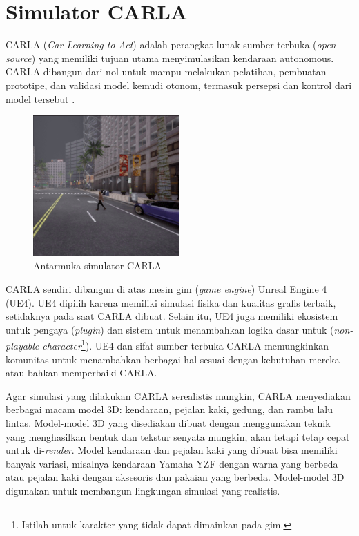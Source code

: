 \section{Simulator CARLA}

CARLA (\textit{Car Learning to Act}) adalah perangkat lunak sumber terbuka
(\textit{o\-pen sour\-ce}) yang memiliki tujuan utama menyimulasikan kendaraan
autonomous. CAR\-LA dibangun dari nol untuk mampu melakukan pelatihan, pembuatan
prototipe, dan validasi model kemudi otonom, termasuk persepsi dan kontrol dari
model tersebut \parencite{dos_carla}.

\begin{figure}[h!]
    \centering
    \includegraphics[width=0.5\textwidth]{resources/chapter-2/CARLA-cropped.png}
    \caption{Antarmuka simulator CARLA}
\end{figure}

CARLA sendiri dibangun di atas mesin gim (\textit{game engine}) Unreal Engine 4
(UE4). UE4 dipilih karena memiliki simulasi fisika dan kualitas grafis terbaik,
setidaknya pada saat CARLA dibuat. Selain itu, UE4 juga memiliki ekosistem untuk
pengaya (\textit{plugin}) dan sistem untuk menambahkan logika dasar untuk
(\textit{non-playable character}\footnote{Istilah untuk karakter yang tidak
    dapat dimainkan pada gim.}). UE4 dan sifat sumber terbuka CARLA memungkinkan
komunitas untuk menambahkan berbagai hal sesuai dengan kebutuhan mereka atau
bahkan memperbaiki CARLA.

Agar simulasi yang dilakukan CARLA serealistis mungkin, CARLA menyediakan
berbagai macam model 3D: kendaraan, pejalan kaki, gedung, dan rambu lalu lintas.
Model-model 3D yang disediakan dibuat dengan menggunakan teknik yang
menghasilkan bentuk dan tekstur senyata mungkin, akan tetapi tetap cepat untuk
di-\textit{render}. Model kendaraan dan pejalan kaki yang dibuat bisa memiliki
banyak variasi, misalnya kendaraan Yamaha YZF dengan warna yang berbeda atau
pejalan kaki dengan aksesoris dan pakaian yang berbeda. Model-model 3D
digunakan untuk membangun lingkungan simulasi yang realistis.

